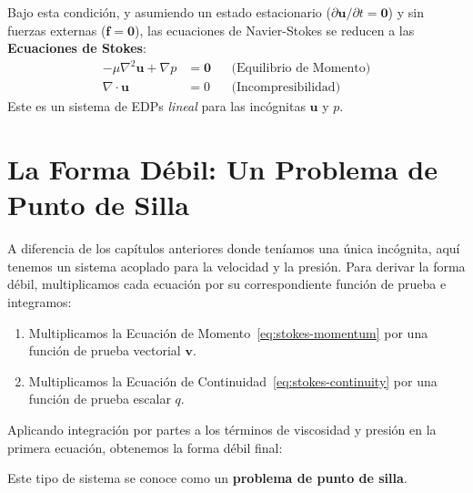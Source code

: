 Bajo esta condición, y asumiendo un estado estacionario (\(\partial\bm{u}/\partial t = \bm{0}\)) y sin fuerzas externas (\(\bm{f}=\bm{0}\)), las ecuaciones de Navier-Stokes se reducen a las \textbf{Ecuaciones de Stokes}:
\begin{align}
    -\mu \nabla^2\bm{u} + \nabla p &= \bm{0} && \text{(Equilibrio de Momento)} \label{eq:stokes-momentum} \\
    \nabla \cdot \bm{u} &= 0 && \text{(Incompresibilidad)} \label{eq:stokes-continuity}
\end{align}
Este es un sistema de EDPs \textit{lineal} para las incógnitas \(\bm{u}\) y \(p\).

\section{La Forma Débil: Un Problema de Punto de Silla}
\label{sec:stokes-weak}
A diferencia de los capítulos anteriores donde teníamos una única incógnita, aquí tenemos un sistema acoplado para la velocidad y la presión. Para derivar la forma débil, multiplicamos cada ecuación por su correspondiente función de prueba e integramos:
\begin{enumerate}
    \item Multiplicamos la Ecuación de Momento~\eqref{eq:stokes-momentum} por una función de prueba vectorial \(\bm{v}\).
    \item Multiplicamos la Ecuación de Continuidad~\eqref{eq:stokes-continuity} por una función de prueba escalar \(q\).
\end{enumerate}
Aplicando integración por partes a los términos de viscosidad y presión en la primera ecuación, obtenemos la forma débil final:

\begin{center}
\end{center}
Este tipo de sistema se conoce como un \textbf{problema de punto de silla}.

